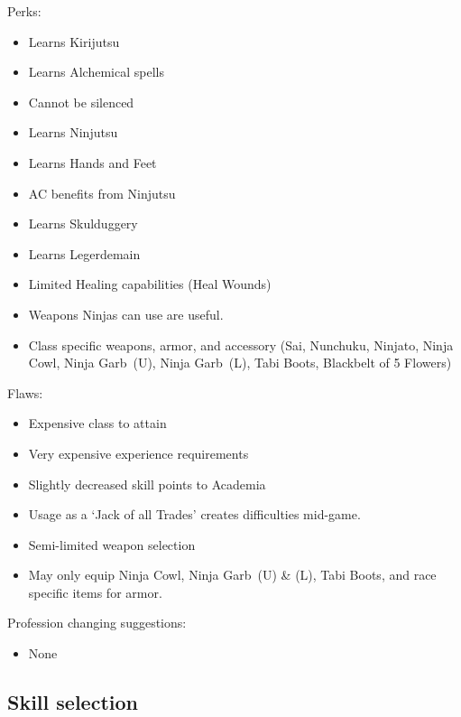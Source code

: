 \documentclass[12pt]{article}
\providecommand{\tightlist}{%
  \setlength{\itemsep}{0pt}\setlength{\parskip}{0pt}}
\newcommand{\indexSpell}[1]{\index{#1}}
\newcommand{\spell}[1]{#1\indexSpell{#1}}
\newcommand{\indexClass}[1]{\index{#1}}
\newcommand{\class}[1]{#1\indexClass{#1}}
\newcommand{\WviiTwoColumnSetup}{\raggedcolumns\RaggedRight}
\begin{document}
\begin{multicols}{2}\WviiTwoColumnSetup
Perks:

\begin{itemize}
\item
  Learns Kirijutsu
\item
  Learns Alchemical spells
\item
  Cannot be silenced
\item
  Learns Ninjutsu
\item
  Learns Hands and Feet
\item
  AC benefits from Ninjutsu
\item
  Learns Skulduggery
\item
  Learns Legerdemain
\item
  Limited Healing capabilities (\spell{Heal Wounds})
\item
  Weapons \class{Ninja}s can use are useful.
\item
  Class specific weapons, armor, and accessory (Sai, Nunchuku, Ninjato,
  Ninja Cowl, Ninja Garb~(U), Ninja Garb~(L), Tabi Boots, Blackbelt of 5
  Flowers)
\end{itemize}
\columnbreak

Flaws:

\begin{itemize}
\item
  Expensive class to attain
\item
  Very expensive experience requirements
\item
  Slightly decreased skill points to Academia
\item
  Usage as a `Jack of all Trades' creates difficulties mid-game.
\item
  Semi-limited weapon selection
\item
  May only equip Ninja Cowl, Ninja Garb~(U) \& (L), Tabi Boots, and race
  specific items for armor.
\end{itemize}
\end{multicols}

Profession changing suggestions:

\begin{itemize}
\tightlist
\item
  None
\end{itemize}

\subsection{Skill selection}\label{skill-selection}
\end{document}
